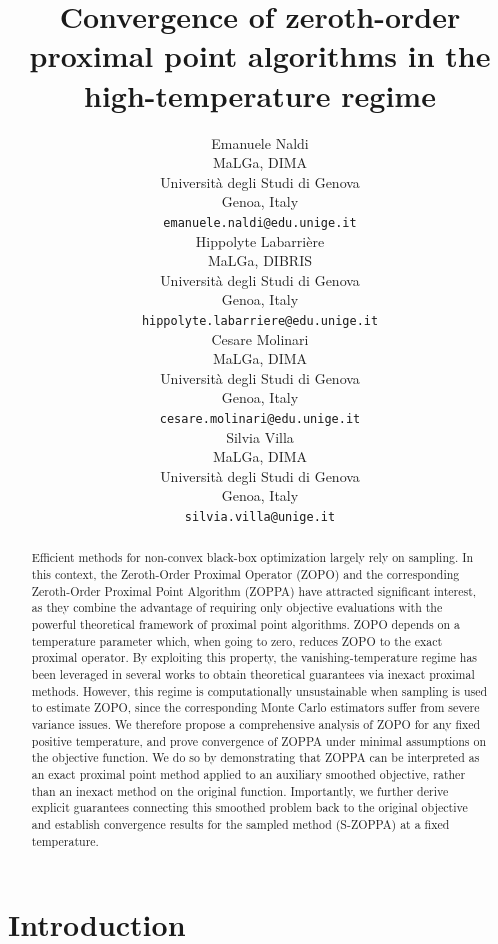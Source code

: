 \documentclass{article}
\title{Convergence of zeroth-order proximal point algorithms in the high-temperature regime}
\author{%
  Emanuele Naldi \\
  MaLGa, DIMA\\
  Universit\`a degli Studi di Genova\\
  Genoa, Italy \\
  \texttt{emanuele.naldi@edu.unige.it} \\
  \And
  Hippolyte Labarri\`ere \\
  MaLGa, DIBRIS\\
  Universit\`a degli Studi di Genova\\
  Genoa, Italy \\
  \texttt{hippolyte.labarriere@edu.unige.it} \\
  \And
  Cesare Molinari \\
  MaLGa, DIMA\\
  Universit\`a degli Studi di Genova\\
  Genoa, Italy \\
  \texttt{cesare.molinari@edu.unige.it} \\
  \And
  Silvia Villa \\
  MaLGa, DIMA\\
  Universit\`a degli Studi di Genova\\
  Genoa, Italy \\
  \texttt{silvia.villa@unige.it} 
}
\begin{document}
\maketitle


\begin{abstract}
Efficient methods for non-convex black-box optimization largely rely on sampling. In this context, the Zeroth-Order Proximal Operator (ZOPO) and the corresponding Zeroth-Order Proximal Point Algorithm (ZOPPA) have attracted significant interest, as they combine the advantage of requiring only objective evaluations with the powerful theoretical framework of proximal point algorithms. ZOPO depends on a temperature parameter which, when going to zero, reduces ZOPO to the exact proximal operator. By exploiting this property, the vanishing-temperature regime has been leveraged in several works to obtain theoretical guarantees via inexact proximal methods. However, this regime is computationally unsustainable when sampling is used to estimate ZOPO, since the corresponding Monte Carlo estimators suffer from severe variance issues. We therefore propose a comprehensive analysis of ZOPO for any fixed positive temperature, and prove convergence of ZOPPA under minimal assumptions on the objective function. We do so by demonstrating that ZOPPA can be interpreted as an exact proximal point method applied to an auxiliary smoothed objective, rather than an inexact method on the original function. Importantly, we further derive explicit guarantees connecting this smoothed problem back to the original objective and establish convergence results for the sampled method (S-ZOPPA) at a fixed temperature.
\end{abstract}


\section{Introduction}\label{sec:sbnsm}
\end{document}
